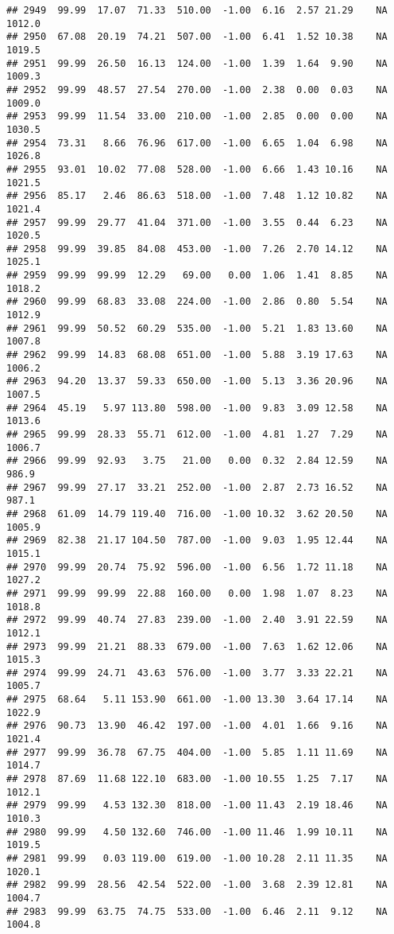 \documentclass{article}\usepackage{graphicx, color}
\makeatletter
\newenvironment{kframe}{%
 \def\at@end@of@kframe{}%
 \ifinner\ifhmode%
  \def\at@end@of@kframe{\end{minipage}}%
  \begin{minipage}{\columnwidth}%
 \fi\fi%
 \def\FrameCommand##1{\hskip\@totalleftmargin \hskip-\fboxsep
 \colorbox{shadecolor}{##1}\hskip-\fboxsep
     \hskip-\linewidth \hskip-\@totalleftmargin \hskip\columnwidth}%
 \MakeFramed {\advance\hsize-\width
   \@totalleftmargin\z@ \linewidth\hsize
   \@setminipage}}%
 {\par\unskip\endMakeFramed%
 \at@end@of@kframe}
\newenvironment{knitrout}{}{} %
\makeatother
\begin{document}
\begin{knitrout}
\begin{kframe}
\begin{verbatim}
## 2949  99.99  17.07  71.33  510.00  -1.00  6.16  2.57 21.29    NA 1012.0
## 2950  67.08  20.19  74.21  507.00  -1.00  6.41  1.52 10.38    NA 1019.5
## 2951  99.99  26.50  16.13  124.00  -1.00  1.39  1.64  9.90    NA 1009.3
## 2952  99.99  48.57  27.54  270.00  -1.00  2.38  0.00  0.03    NA 1009.0
## 2953  99.99  11.54  33.00  210.00  -1.00  2.85  0.00  0.00    NA 1030.5
## 2954  73.31   8.66  76.96  617.00  -1.00  6.65  1.04  6.98    NA 1026.8
## 2955  93.01  10.02  77.08  528.00  -1.00  6.66  1.43 10.16    NA 1021.5
## 2956  85.17   2.46  86.63  518.00  -1.00  7.48  1.12 10.82    NA 1021.4
## 2957  99.99  29.77  41.04  371.00  -1.00  3.55  0.44  6.23    NA 1020.5
## 2958  99.99  39.85  84.08  453.00  -1.00  7.26  2.70 14.12    NA 1025.1
## 2959  99.99  99.99  12.29   69.00   0.00  1.06  1.41  8.85    NA 1018.2
## 2960  99.99  68.83  33.08  224.00  -1.00  2.86  0.80  5.54    NA 1012.9
## 2961  99.99  50.52  60.29  535.00  -1.00  5.21  1.83 13.60    NA 1007.8
## 2962  99.99  14.83  68.08  651.00  -1.00  5.88  3.19 17.63    NA 1006.2
## 2963  94.20  13.37  59.33  650.00  -1.00  5.13  3.36 20.96    NA 1007.5
## 2964  45.19   5.97 113.80  598.00  -1.00  9.83  3.09 12.58    NA 1013.6
## 2965  99.99  28.33  55.71  612.00  -1.00  4.81  1.27  7.29    NA 1006.7
## 2966  99.99  92.93   3.75   21.00   0.00  0.32  2.84 12.59    NA  986.9
## 2967  99.99  27.17  33.21  252.00  -1.00  2.87  2.73 16.52    NA  987.1
## 2968  61.09  14.79 119.40  716.00  -1.00 10.32  3.62 20.50    NA 1005.9
## 2969  82.38  21.17 104.50  787.00  -1.00  9.03  1.95 12.44    NA 1015.1
## 2970  99.99  20.74  75.92  596.00  -1.00  6.56  1.72 11.18    NA 1027.2
## 2971  99.99  99.99  22.88  160.00   0.00  1.98  1.07  8.23    NA 1018.8
## 2972  99.99  40.74  27.83  239.00  -1.00  2.40  3.91 22.59    NA 1012.1
## 2973  99.99  21.21  88.33  679.00  -1.00  7.63  1.62 12.06    NA 1015.3
## 2974  99.99  24.71  43.63  576.00  -1.00  3.77  3.33 22.21    NA 1005.7
## 2975  68.64   5.11 153.90  661.00  -1.00 13.30  3.64 17.14    NA 1022.9
## 2976  90.73  13.90  46.42  197.00  -1.00  4.01  1.66  9.16    NA 1021.4
## 2977  99.99  36.78  67.75  404.00  -1.00  5.85  1.11 11.69    NA 1014.7
## 2978  87.69  11.68 122.10  683.00  -1.00 10.55  1.25  7.17    NA 1012.1
## 2979  99.99   4.53 132.30  818.00  -1.00 11.43  2.19 18.46    NA 1010.3
## 2980  99.99   4.50 132.60  746.00  -1.00 11.46  1.99 10.11    NA 1019.5
## 2981  99.99   0.03 119.00  619.00  -1.00 10.28  2.11 11.35    NA 1020.1
## 2982  99.99  28.56  42.54  522.00  -1.00  3.68  2.39 12.81    NA 1004.7
## 2983  99.99  63.75  74.75  533.00  -1.00  6.46  2.11  9.12    NA 1004.8

\end{verbatim}
\end{kframe}
\end{knitrout}
\end{document}
